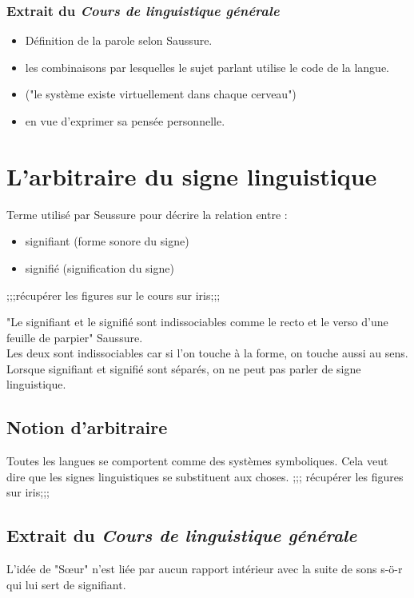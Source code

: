 \subsubsection{Extrait du \textit{Cours de linguistique générale}}
\begin{itemize}
   \item Définition de la parole selon Saussure.
   \item les combinaisons par lesquelles le sujet parlant utilise le code de la langue.
   \item ("le système existe virtuellement dans chaque cerveau")
   \item en vue d'exprimer sa pensée personnelle.
\end{itemize}

\section{L'arbitraire du signe linguistique}
\begin{def}
   Terme utilisé par Seussure pour décrire la relation entre :
  \begin{itemize} 
      \item signifiant (forme sonore du signe)
      \item signifié (signification du signe)
  \end{itemize}
  ;;;récupérer les figures sur le cours sur iris;;;
\end{def}
"Le signifiant et le signifié sont indissociables comme le recto et le verso d'une feuille de parpier" Saussure.\\
Les deux sont indissociables car si l'on touche à la forme, on touche aussi au sens.\\
Lorsque signifiant et signifié sont séparés, on ne peut pas parler de signe linguistique.

\subsection{Notion d'arbitraire}
\begin{def}
   Toutes les langues se comportent comme des systèmes symboliques.
   Cela veut dire que les signes linguistiques se substituent aux choses.
   ;;; récupérer les figures sur iris;;;
\end{def}

\subsection{Extrait du \textit{Cours de linguistique générale}}
L'idée de "Sœur" n'est liée par aucun rapport intérieur avec la suite de sons \/s-ö-r\/ qui lui sert de signifiant.

